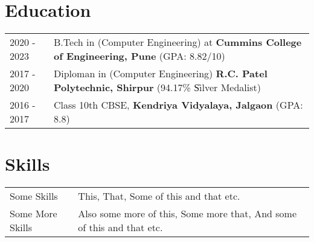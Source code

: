 \documentclass[a4paper,12pt]{article}
\begin{document}
\section{Education}
\begin{tabularx}{\linewidth}{@{}l X@{}}	
2020 - 2023 & B.Tech in (Computer Engineering) at \textbf{Cummins College of Engineering, Pune} \hfill \normalsize (GPA: 8.82/10) \\

2017 - 2020 & Diploman in (Computer Engineering) \textbf{R.C. Patel Polytechnic, Shirpur} \hfill (94.17\% \| Silver Medalist) \\ 

2016 - 2017 & Class 10th CBSE, \textbf{Kendriya Vidyalaya, Jalgaon}  \hfill  (GPA: 8.8) \\

\end{tabularx}


\section{Skills}
\begin{tabularx}{\linewidth}{@{}l X@{}}
Some Skills &  \normalsize{This, That, Some of this and that etc.}\\
Some More Skills  &  \normalsize{Also some more of this, Some more that, And some of this and that etc.}\\  
\end{tabularx}

\vfill
\end{document}
